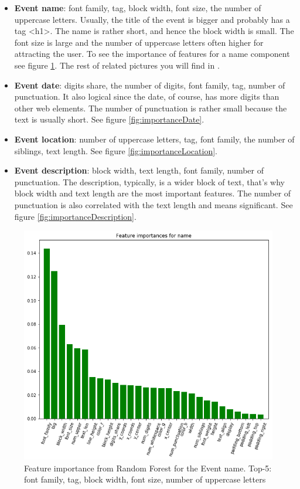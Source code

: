 \begin{itemize}
    \item \textbf{Event name}: font family, tag, block width, font size, the number of uppercase letters. Usually, the title of the event is bigger and probably has a tag <h1>. The name is rather short, and hence the block width is small. The font size is large and the number of uppercase letters often higher for attracting the user. To see the importance of features for a name component see figure \ref{fig:importanceName}. The rest of related pictures you will find in .
    \item \textbf{Event date}: digits share, the number of digits, font family, tag, number of punctuation. It also logical since the date, of course, has more digits than other web elements. The number of punctuation is rather small because the text is usually short. See figure \ref{fig:importanceDate}.
    \item \textbf{Event location}: number of uppercase letters, tag, font family, the number of siblings, text length. See figure \ref{fig:importanceLocation}.
    \item \textbf{Event description}: block width, text length, font family, number of punctuation. The description, typically, is a wider block of text, that's why block width and text length are the most important features. The number of punctuation is also correlated with the text length and means significant. See figure \ref{fig:importanceDescription}.
\end{itemize}

\begin{figure}[h]
\begin{center}
\includegraphics[width=1.0\textwidth]{figures08/importanceName}
\caption{Feature importance from Random Forest for the Event name. Top-5: font family, tag, block width, font size, number of uppercase letters}
\label{fig:importanceName}
\end{center}
\end{figure}


